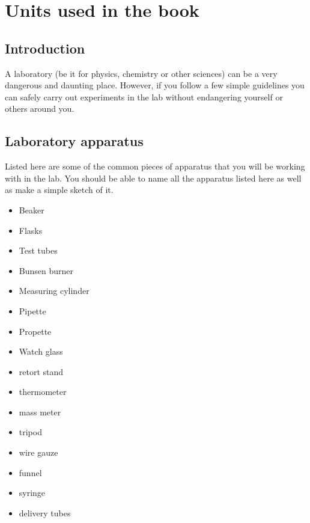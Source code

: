          \chapter{Units used in the book}
    \setcounter{figure}{1}
    \setcounter{subfigure}{1}
    \label{m38491}
\section{ Introduction}
            \nopagebreak
\label{m38491*id5632}A laboratory (be it for physics, chemistry or other sciences) can be a very dangerous and daunting place. However, if you follow a few simple guidelines you can safely carry out experiments in the lab without endangering yourself or others around you.
\par 
\section{Laboratory apparatus}
Listed here are some of the common pieces of apparatus that you will be working with in the lab. You should be able to name all the apparatus listed here as well as make a simple sketch of it. 
\begin{itemize}
 \item Beaker 
\item Flasks
\item Test tubes
\item Bunsen burner
\item Measuring cylinder
\item Pipette
\item Propette
\item Watch glass
\item retort stand
\item thermometer
\item mass meter
\item tripod
\item wire gauze
\item funnel
\item syringe
\item delivery tubes 
\end{itemize}

